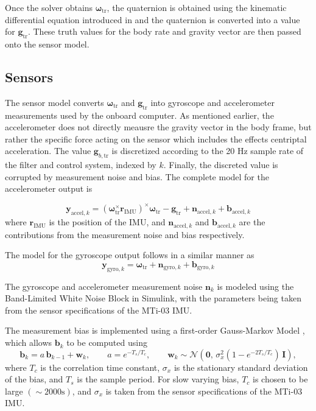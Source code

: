 Once the solver obtains $\bm{\omega}_\text{tr}$, the quaternion is obtained using the kinematic differential equation introduced in  and the quaternion is converted into a value for $\bm{g}_\text{tr}$. These truth values for the body rate and gravity vector are then passed onto the sensor model.

\subsection{Sensors}

The sensor model converts $\bm{\omega}_\text{tr}$ and $\bm{g}_{\text{tr}}$ into gyroscope and accelerometer measurements used by the onboard computer. As mentioned earlier, the accelerometer does not directly meausre the gravity vector in the body frame, but rather the specific force acting on the sensor which includes the effects centriptal acceleration. The value $\bm{g}_{b,\text{tr}}$ is discretized according to the 20 Hz sample rate of the filter and control system, indexed by $k$. Finally, the discreted value is corrupted by measurement noise and bias. The complete model for the accelerometer output is

\begin{equation}
    \bm{y}_{\text{accel},k}= (\bm{\omega}_{\text{tr}}^{\times}\bm{r}_\text{IMU})^{\times}\bm{\omega}_{\text{tr}}-\bm{g}_{\text{tr}} + \bm{n}_{\text{accel},k} + \bm{b}_{\text{accel},k}
\end{equation}
where $\bm{r}_\text{IMU}$ is the position of the IMU, and $\bm{n}_{\text{accel},k}$ and $\bm{b}_{\text{accel},k}$ are the contributions from the measurement noise and bias respectively.

The model for the gyroscope output follows in a similar manner as
\begin{equation}
    \bm{y}_{\text{gyro},k}= \bm{\omega}_{\text{tr}} + \bm{n}_{\text{gyro},k} + \bm{b}_{\text{gyro},k}
\end{equation}

The gyroscope and accelerometer measurement noise $\bm{n}_k$ is modeled using the Band-Limited White Noise Block in Simulink, with the parameters being taken from the sensor specifications of the MTi-03 IMU. 

The measurement bias is implemented using a first-order Gauss-Markov Model \cite{unsal_estimation_2012}, which allows $\bm{b}_k$ to be computed using
\begin{equation}
    \bm{b}_{k} = a\,\bm{b}_{k-1} + \bm{w}_k, \qquad
    a = e^{-T_s/T_c}, \qquad
    \bm{w}_k \sim \mathcal{N}\!\left(\bm{0},\,\sigma_x^2 (1-e^{-2T_s/T_c})\,\bm{I}\right),
\end{equation}
where $T_c$ is the correlation time constant, $\sigma_x$ is the stationary standard deviation of the bias, and $T_s$ is the sample period. For slow varying bias, $T_c$ is chosen to be large $(\sim2000\text{s})$, and $\sigma_x$ is taken from the sensor specifications of the MTi-03 IMU. 

